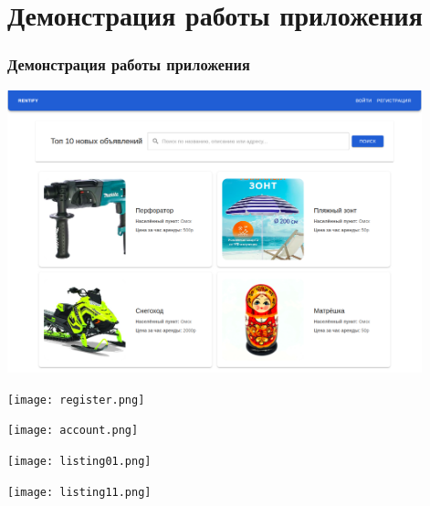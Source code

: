 \documentclass[12pt]{beamer}
\begin{document}
{
    
    \section{Демонстрация работы приложения}
    \begin{frame}
    \frametitle{Демонстрация работы приложения}
        \begin{center}
            \includegraphics[width=0.9\textwidth]{homePage.png}
        \end{center}
    \end{frame}

    \begin{frame}
        \begin{center}
            \texttt{[image: register.png]}
        \end{center}
    \end{frame}

    \begin{frame}
        \begin{center}
            \texttt{[image: account.png]}
        \end{center}
    \end{frame}

    \begin{frame}
        \begin{center}
            \texttt{[image: listing01.png]}
        \end{center}
    \end{frame}

    \begin{frame}
        \begin{center}
            \texttt{[image: listing11.png]}
        \end{center}
    \end{frame}

}
\end{document}
